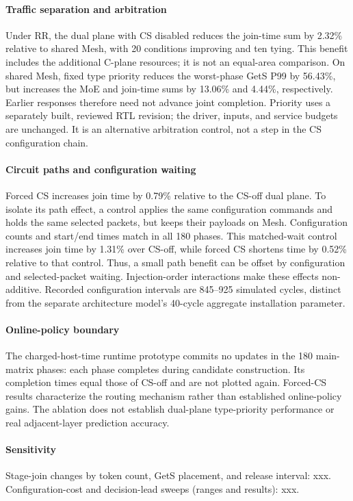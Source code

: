 \documentclass[conference,10pt]{IEEEtran}
\begin{document}
\paragraph{Traffic separation and arbitration}
Under RR, the dual plane with CS disabled reduces the join-time sum by
2.32\% relative to shared Mesh, with 20 conditions improving and ten tying.
This benefit includes the additional C-plane resources; it is not an
equal-area comparison. On shared Mesh, fixed type priority reduces the
worst-phase GetS P99 by 56.43\%, but increases the MoE and join-time sums by
13.06\% and 4.44\%, respectively. Earlier responses therefore need not
advance joint completion. Priority uses a separately built, reviewed RTL
revision; the driver, inputs, and service budgets are unchanged. It is an
alternative arbitration control, not a step in the CS configuration chain.

\paragraph{Circuit paths and configuration waiting}
Forced CS increases join time by 0.79\% relative to the CS-off dual plane.
To isolate its path effect, a control applies the same configuration commands
and holds the same selected packets, but keeps their payloads on Mesh.
Configuration counts and start/end times match in all 180 phases. This
matched-wait control increases join time by 1.31\% over CS-off, while forced
CS shortens time by 0.52\% relative to that control. Thus, a small path benefit
can be offset by configuration and selected-packet waiting. Injection-order
interactions make these effects non-additive. Recorded configuration
intervals are 845--925 simulated cycles, distinct from the separate
architecture model's 40-cycle aggregate installation parameter.

\paragraph{Online-policy boundary}
The charged-host-time runtime prototype commits no updates in the 180
main-matrix phases: each phase completes during candidate construction.
Its completion times equal those of CS-off and are not plotted again.
Forced-CS results characterize the routing mechanism rather than established
online-policy gains. The ablation does not establish dual-plane type-priority
performance or real adjacent-layer prediction accuracy.

\paragraph{Sensitivity}
Stage-join changes by token count, GetS placement, and release interval:
xxx. Configuration-cost and decision-lead sweeps (ranges and results):
xxx.
\end{document}
